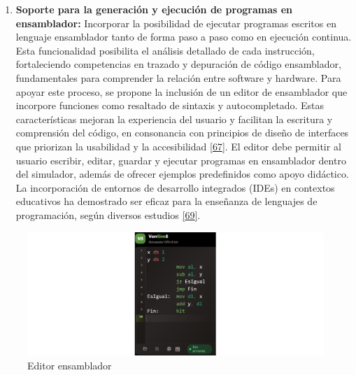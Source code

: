 \documentclass[12pt,oneside]{templates/unerthesis}
\providecommand{\tightlist}{%
  \setlength{\itemsep}{0pt}\setlength{\parskip}{0pt}}
\begin{document}
\begin{enumerate}
\def\labelenumi{\arabic{enumi}.}
\setcounter{enumi}{1}
\tightlist
\item
  \textbf{Soporte para la generación y ejecución de programas en ensamblador:}
  Incorporar la posibilidad de ejecutar programas escritos en lenguaje ensamblador tanto de forma paso a paso como en ejecución continua. Esta funcionalidad posibilita el análisis detallado de cada instrucción, fortaleciendo competencias en trazado y depuración de código ensamblador, fundamentales para comprender la relación entre software y hardware.
  Para apoyar este proceso, se propone la inclusión de un editor de ensamblador que incorpore funciones como resaltado de sintaxis y autocompletado. Estas características mejoran la experiencia del usuario y facilitan la escritura y comprensión del código, en consonancia con principios de diseño de interfaces que priorizan la usabilidad y la accesibilidad \protect\hyperlink{ref-w3c_accessibility_2021}{{[}67{]}}. El editor debe permitir al usuario escribir, editar, guardar y ejecutar programas en ensamblador dentro del simulador, además de ofrecer ejemplos predefinidos como apoyo didáctico. La incorporación de entornos de desarrollo integrados (IDEs) en contextos educativos ha demostrado ser eficaz para la enseñanza de lenguajes de programación, según diversos estudios \protect\hyperlink{ref-mccracken2001does}{{[}69{]}}.
\end{enumerate}

\begin{figure}

{\centering \includegraphics[width=1\linewidth]{images/editor} 

}

\caption{Editor ensamblador}\label{fig:editor}
\end{figure}
\end{document}
